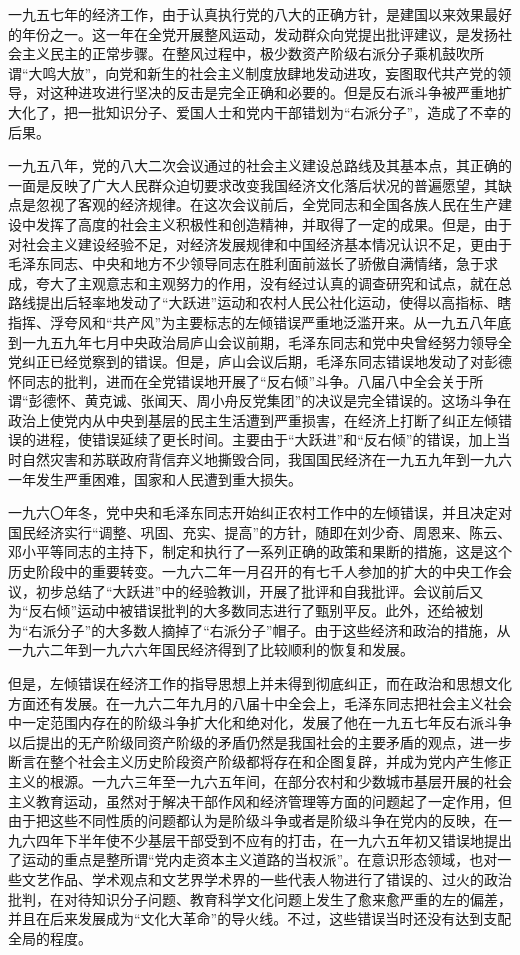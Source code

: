 一九五七年的经济工作，由于认真执行党的八大的正确方针，是建国以来效果最好的年份之一。这一年在全党开展整风运动，发动群众向党提出批评建议，是发扬社会主义民主的正常步骤。在整风过程中，极少数资产阶级右派分子乘机鼓吹所谓“大鸣大放”，向党和新生的社会主义制度放肆地发动进攻，妄图取代共产党的领导，对这种进攻进行坚决的反击是完全正确和必要的。但是反右派斗争被严重地扩大化了，把一批知识分子、爱国人士和党内干部错划为“右派分子”，造成了不幸的后果。

一九五八年，党的八大二次会议通过的社会主义建设总路线及其基本点，其正确的一面是反映了广大人民群众迫切要求改变我国经济文化落后状况的普遍愿望，其缺点是忽视了客观的经济规律。在这次会议前后，全党同志和全国各族人民在生产建设中发挥了高度的社会主义积极性和创造精神，并取得了一定的成果。但是，由于对社会主义建设经验不足，对经济发展规律和中国经济基本情况认识不足，更由于毛泽东同志、中央和地方不少领导同志在胜利面前滋长了骄傲自满情绪，急于求成，夸大了主观意志和主观努力的作用，没有经过认真的调查研究和试点，就在总路线提出后轻率地发动了“大跃进”运动和农村人民公社化运动，使得以高指标、瞎指挥、浮夸风和“共产风”为主要标志的左倾错误严重地泛滥开来。从一九五八年底到一九五九年七月中央政治局庐山会议前期，毛泽东同志和党中央曾经努力领导全党纠正已经觉察到的错误。但是，庐山会议后期，毛泽东同志错误地发动了对彭德怀同志的批判，进而在全党错误地开展了“反右倾”斗争。八届八中全会关于所谓“彭德怀、黄克诚、张闻天、周小舟反党集团”的决议是完全错误的。这场斗争在政治上使党内从中央到基层的民主生活遭到严重损害，在经济上打断了纠正左倾错误的进程，使错误延续了更长时间。主要由于“大跃进”和“反右倾”的错误，加上当时自然灾害和苏联政府背信弃义地撕毁合同，我国国民经济在一九五九年到一九六一年发生严重困难，国家和人民遭到重大损失。

一九六〇年冬，党中央和毛泽东同志开始纠正农村工作中的左倾错误，并且决定对国民经济实行“调整、巩固、充实、提高”的方针，随即在刘少奇、周恩来、陈云、邓小平等同志的主持下，制定和执行了一系列正确的政策和果断的措施，这是这个历史阶段中的重要转变。一九六二年一月召开的有七千人参加的扩大的中央工作会议，初步总结了“大跃进”中的经验教训，开展了批评和自我批评。会议前后又为“反右倾”运动中被错误批判的大多数同志进行了甄别平反。此外，还给被划为“右派分子”的大多数人摘掉了“右派分子”帽子。由于这些经济和政治的措施，从一九六二年到一九六六年国民经济得到了比较顺利的恢复和发展。

但是，左倾错误在经济工作的指导思想上并未得到彻底纠正，而在政治和思想文化方面还有发展。在一九六二年九月的八届十中全会上，毛泽东同志把社会主义社会中一定范围内存在的阶级斗争扩大化和绝对化，发展了他在一九五七年反右派斗争以后提出的无产阶级同资产阶级的矛盾仍然是我国社会的主要矛盾的观点，进一步断言在整个社会主义历史阶段资产阶级都将存在和企图复辟，并成为党内产生修正主义的根源。一九六三年至一九六五年间，在部分农村和少数城市基层开展的社会主义教育运动，虽然对于解决干部作风和经济管理等方面的问题起了一定作用，但由于把这些不同性质的问题都认为是阶级斗争或者是阶级斗争在党内的反映，在一九六四年下半年使不少基层干部受到不应有的打击，在一九六五年初又错误地提出了运动的重点是整所谓“党内走资本主义道路的当权派”。在意识形态领域，也对一些文艺作品、学术观点和文艺界学术界的一些代表人物进行了错误的、过火的政治批判，在对待知识分子问题、教育科学文化问题上发生了愈来愈严重的左的偏差，并且在后来发展成为“文化大革命”的导火线。不过，这些错误当时还没有达到支配全局的程度。

